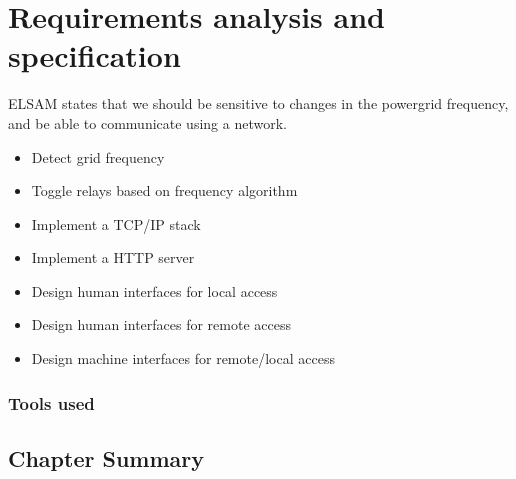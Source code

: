 \chapter[Requirements]{Requirements analysis and specification}
\label{chap:requirements}
ELSAM states that we should be sensitive to changes in the powergrid frequency, and be able to communicate using a network.

\begin{itemize}
\item Detect grid frequency
\item Toggle relays based on frequency algorithm
\item Implement a TCP/IP stack
\item Implement a HTTP server
\item Design human interfaces for local access
\item Design human interfaces for remote access
\item Design machine interfaces for remote/local access
\end{itemize}

\subsection{Tools used}

\section{Chapter Summary}
\label{sec:SummaryChap2}



